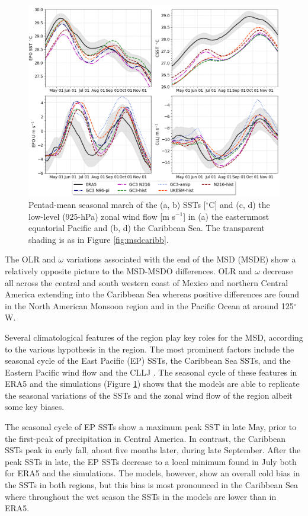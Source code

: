  \begin{figure}[t!]
\includegraphics[width=\linewidth]{figures/index_seasonal}
\caption{Pentad-mean seasonal march of the (a, b) SSTs [$^\circ$C] and (c, d) the low-level (925-hPa) zonal wind flow [m s$^{-1}$] in (a) the easternmost equatorial Pacific and (b, d) the Caribbean Sea. The transparent shading is as in Figure \ref{fig:msdcaribb}.}
\label{fig:csst}
\end{figure}
 
 
 The OLR and $\omega$ variations associated with the end of the MSD (MSDE) show a relatively opposite picture to the MSD-MSDO differences. OLR and $\omega$ decrease all across the central and south western coast of Mexico and northern Central America extending into the Caribbean Sea whereas positive differences are found in the North American Monsoon region and in the Pacific Ocean at around 125$^\circ$W.  

Several climatological features of the region play key roles for the MSD, according to the various hypothesis in the region. The most prominent factors include the seasonal cycle of the East Pacific (EP) SSTs, the Caribbean Sea SSTs, and the Eastern Pacific wind flow and the CLLJ \citep{magana1999,amador2008,herrera2015,straffon2019,garcia2020sub}. 
The seasonal cycle of these features in ERA5 and the simulations (Figure \ref{fig:csst}) shows that the models are able to replicate the seasonal variations of the SSTs and the zonal wind flow of the region albeit some key biases. 

The seasonal cycle of EP SSTs show a maximum peak SST in late May, prior to the first-peak of precipitation in Central America. In contrast, the Caribbean SSTs peak in early fall, about five months later, during late September. After the peak SSTs in late, the EP SSTs decrease to a local minimum found in July both for ERA5 and the simulations. The models, however, show an overall cold bias in the SSTs in both regions, but this bias is most pronounced in the Caribbean Sea where throughout the wet season the SSTs in the models are lower than in ERA5. 

